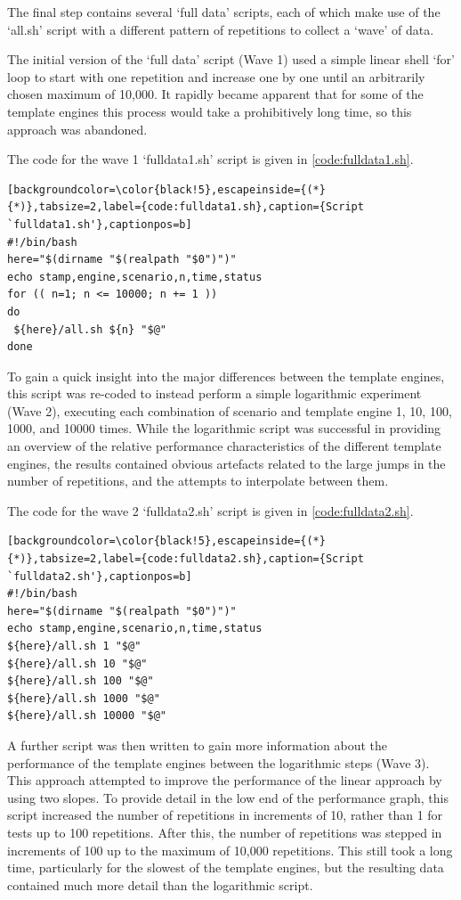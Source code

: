 The final step contains several `full data' scripts, each of which make use of the `all.sh' script with a different pattern of repetitions to collect a `wave' of data.

The initial version of the `full data' script (Wave 1) used a simple linear shell `for' loop to start with one repetition and increase one by one until an arbitrarily chosen maximum of 10,000. It rapidly became apparent that for some of the template engines this process would take a prohibitively long time, so this approach was abandoned.

The code for the wave 1 `fulldata1.sh' script is given in \autoref{code:fulldata1.sh}.

\begin{lstlisting}[backgroundcolor=\color{black!5},escapeinside={(*}{*)},tabsize=2,label={code:fulldata1.sh},caption={Script `fulldata1.sh'},captionpos=b]
#!/bin/bash
here="$(dirname "$(realpath "$0")")"
echo stamp,engine,scenario,n,time,status
for (( n=1; n <= 10000; n += 1 ))
do
 ${here}/all.sh ${n} "$@"
done
\end{lstlisting}

To gain a quick insight into the major differences between the template engines, this script was re-coded to instead perform a simple logarithmic experiment (Wave 2), executing each combination of scenario and template engine 1, 10, 100, 1000, and 10000 times. While the logarithmic script was successful in providing an overview of the relative performance characteristics of the different template engines, the results contained obvious artefacts related to the large jumps in the number of repetitions, and the attempts to interpolate between them.

The code for the wave 2 `fulldata2.sh' script is given in \autoref{code:fulldata2.sh}.

\begin{lstlisting}[backgroundcolor=\color{black!5},escapeinside={(*}{*)},tabsize=2,label={code:fulldata2.sh},caption={Script `fulldata2.sh'},captionpos=b]
#!/bin/bash
here="$(dirname "$(realpath "$0")")"
echo stamp,engine,scenario,n,time,status
${here}/all.sh 1 "$@"
${here}/all.sh 10 "$@"
${here}/all.sh 100 "$@"
${here}/all.sh 1000 "$@"
${here}/all.sh 10000 "$@"
\end{lstlisting}

A further script was then written to gain more information about the performance of the template engines between the logarithmic steps (Wave 3). This approach attempted to improve the performance of the linear approach by using two slopes. To provide detail in the low end of the performance graph, this script increased the number of repetitions in increments of 10, rather than 1 for tests up to 100 repetitions. After this, the number of repetitions was stepped in increments of 100 up to the maximum of 10,000 repetitions. This still took a long time, particularly for the slowest of the template engines, but the resulting data contained much more detail than the logarithmic script.

